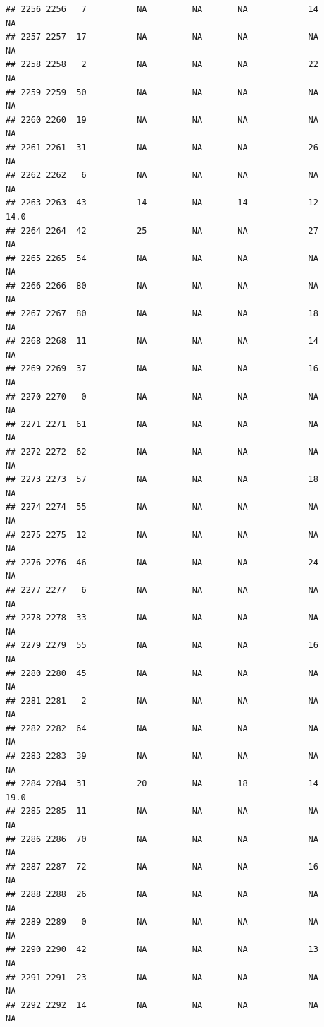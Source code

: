 \documentclass[man]{apa6}
\begin{document}
\begin{verbatim}
## 2256 2256   7          NA         NA       NA            14       NA
## 2257 2257  17          NA         NA       NA            NA       NA
## 2258 2258   2          NA         NA       NA            22       NA
## 2259 2259  50          NA         NA       NA            NA       NA
## 2260 2260  19          NA         NA       NA            NA       NA
## 2261 2261  31          NA         NA       NA            26       NA
## 2262 2262   6          NA         NA       NA            NA       NA
## 2263 2263  43          14         NA       14            12     14.0
## 2264 2264  42          25         NA       NA            27       NA
## 2265 2265  54          NA         NA       NA            NA       NA
## 2266 2266  80          NA         NA       NA            NA       NA
## 2267 2267  80          NA         NA       NA            18       NA
## 2268 2268  11          NA         NA       NA            14       NA
## 2269 2269  37          NA         NA       NA            16       NA
## 2270 2270   0          NA         NA       NA            NA       NA
## 2271 2271  61          NA         NA       NA            NA       NA
## 2272 2272  62          NA         NA       NA            NA       NA
## 2273 2273  57          NA         NA       NA            18       NA
## 2274 2274  55          NA         NA       NA            NA       NA
## 2275 2275  12          NA         NA       NA            NA       NA
## 2276 2276  46          NA         NA       NA            24       NA
## 2277 2277   6          NA         NA       NA            NA       NA
## 2278 2278  33          NA         NA       NA            NA       NA
## 2279 2279  55          NA         NA       NA            16       NA
## 2280 2280  45          NA         NA       NA            NA       NA
## 2281 2281   2          NA         NA       NA            NA       NA
## 2282 2282  64          NA         NA       NA            NA       NA
## 2283 2283  39          NA         NA       NA            NA       NA
## 2284 2284  31          20         NA       18            14     19.0
## 2285 2285  11          NA         NA       NA            NA       NA
## 2286 2286  70          NA         NA       NA            NA       NA
## 2287 2287  72          NA         NA       NA            16       NA
## 2288 2288  26          NA         NA       NA            NA       NA
## 2289 2289   0          NA         NA       NA            NA       NA
## 2290 2290  42          NA         NA       NA            13       NA
## 2291 2291  23          NA         NA       NA            NA       NA
## 2292 2292  14          NA         NA       NA            NA       NA

\end{verbatim}
\end{document}
